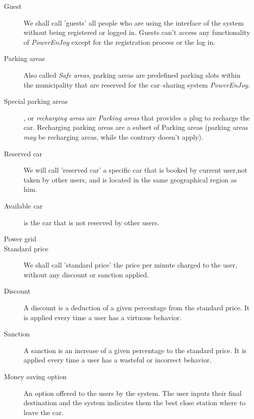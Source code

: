 \documentclass{article}
\begin{document}
\begin{description}
				\item[Guest] We shall call 'guests' all people who are using the interface of the system without being registered or logged in. Guests can't access any functionality of \textit{PowerEnJoy} except for the registration process or the log in. 
				
				
				\item[Parking areas] Also called \textit{Safe areas}, parking areas are predefined parking slots within the municipality that are reserved for the car–sharing system \textit{PowerEnJoy}.
				\item[Special parking areas], or \textit{recharging areas} are \textit{Parking areas} that provides a plug to recharge the car. Recharging parking areas are a subset of Parking areas (parking areas \textit{may} be recharging areas, while the contrary doesn't apply).
				
				\item [Reserved car] We will call 'reserved car' a specific car that is booked by current user,not taken by other users, and is located in the same geographical region as him.
				
				\item [Available car] is the car that is not reserved by other users.
				
				\item[Power grid] %
				
				\item[Standard price] We shall call 'standard price' the price per minute charged to the user, without any discount or sanction applied. 
				
				\item[Discount] A discount is a deduction of a given percentage from the standard price. It is applied every time a user has a virtuous behavior. %
				\item[Sanction] A sanction is an increase of a given percentage to the standard price. It is applied every time a user has a wasteful or incorrect behavior. %
				
				\item[Money saving option] An option offered to the users by the system. The user inputs their final destination and the system indicates them the best close station where to leave the car.
			\end{description}
\end{document}

